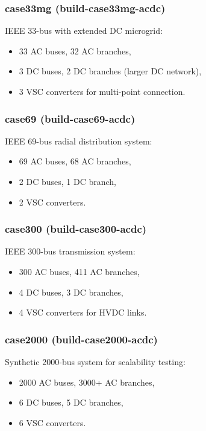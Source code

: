 \documentclass[11pt]{article}
\def\code#1{#1}%
\def\_{-}%
\newcommand{\code}[1]{\nolinkurl{#1}}
\begin{document}
\subsubsection{case33mg (\code{build\_case33mg\_acdc})}
IEEE 33-bus with extended DC microgrid:
\begin{itemize}[leftmargin=*]
  \item 33 AC buses, 32 AC branches,
  \item 3 DC buses, 2 DC branches (larger DC network),
  \item 3 VSC converters for multi-point connection.
\end{itemize}

\subsubsection{case69 (\code{build\_case69\_acdc})}
IEEE 69-bus radial distribution system:
\begin{itemize}[leftmargin=*]
  \item 69 AC buses, 68 AC branches,
  \item 2 DC buses, 1 DC branch,
  \item 2 VSC converters.
\end{itemize}

\subsubsection{case300 (\code{build\_case300\_acdc})}
IEEE 300-bus transmission system:
\begin{itemize}[leftmargin=*]
  \item 300 AC buses, 411 AC branches,
  \item 4 DC buses, 3 DC branches,
  \item 4 VSC converters for HVDC links.
\end{itemize}

\subsubsection{case2000 (\code{build\_case2000\_acdc})}
Synthetic 2000-bus system for scalability testing:
\begin{itemize}[leftmargin=*]
  \item 2000 AC buses, 3000+ AC branches,
  \item 6 DC buses, 5 DC branches,
  \item 6 VSC converters.
\end{itemize}
\end{document}
